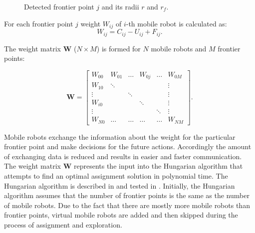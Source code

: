 \documentclass[letterpaper, 10 pt, conference]{ieeeconf}  %
\begin{document}
\begin{figure}[b!]
	\centering
	\caption{Detected frontier point $j$ and its radii $r$ and $r_{f}$.}
	\label{fig:radijusi}
\end{figure}

For each frontier point $j$ weight $W_{ij}$ of $i$-th mobile robot is calculated as: 
\begin{equation}
   {W}_{ij}= {C_{ij}} - {U_{ij}} + {F_{ij}}.
   \label{weight}
\end{equation}

The weight matrix $\boldsymbol{W}$ ($N\times M$) is formed for $N$ mobile robots and $M$ frontier points: 

\begin{equation}
    \boldsymbol{W} = \begin{bmatrix}
    W_{00} & W_{01} & \hdots & W_{0j} & \hdots & W_{0M}\\
    W_{10} & \ddots & & & & \vdots\\
    \vdots & & \ddots & & &  \vdots \\
    W_{i0} & & & \ddots & & \vdots \\
    \vdots & & & & \ddots & \vdots\\
    W_{N0} & \hdots  & \hdots  & \hdots  & \hdots &    W_{NM}
    \end{bmatrix}.
\end{equation}

Mobile robots exchange the information about the weight for the particular frontier point and make decisions for the future actions. Accordingly the amount of exchanging data is reduced and results in easier and faster communication.
The weight matrix $\boldsymbol{W}$ represents the input into the Hungarian algorithm that attempts to find an optimal assignment solution in polynomial time. The Hungarian algorithm is described in \cite{hungarian} and tested in \cite{comparison}. Initially, the Hungarian algorithm assumes that the number of frontier points is the same as the number of mobile robots. Due to the fact that there are mostly more mobile robots than frontier points, virtual mobile robots are added and then skipped during the process of assignment and exploration.
\end{document}
